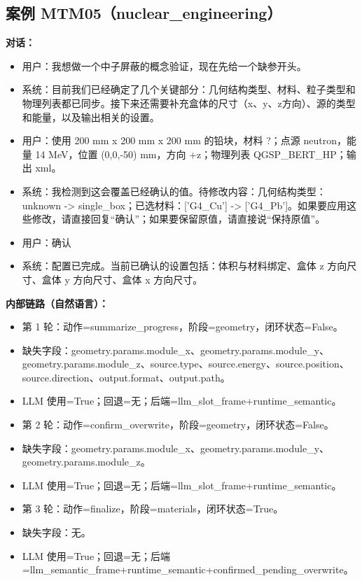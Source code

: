 \documentclass[11pt]{ctexart}
\begin{document}
\subsection{案例 MTM05（nuclear\_engineering）}
\textbf{对话：}
\begin{itemize}
\item 用户：我想做一个中子屏蔽的概念验证，现在先给一个缺参开头。
\item 系统：目前我们已经确定了几个关键部分：几何结构类型、材料、粒子类型和物理列表都已同步。接下来还需要补充盒体的尺寸（x、y、z方向）、源的类型和能量，以及输出相关的设置。
\item 用户：使用 200 mm x 200 mm x 200 mm 的铅块，材料 ?；点源 neutron，能量 14 MeV，位置 (0,0,-50) mm，方向 +z；物理列表 QGSP\_BERT\_HP；输出 xml。
\item 系统：我检测到这会覆盖已经确认的值。待修改内容：几何结构类型：unknown -> single\_box；已选材料：['G4\_Cu'] -> ['G4\_Pb']。如果要应用这些修改，请直接回复“确认”；如果要保留原值，请直接说“保持原值”。
\item 用户：确认
\item 系统：配置已完成。当前已确认的设置包括：体积与材料绑定、盒体 z 方向尺寸、盒体 y 方向尺寸、盒体 x 方向尺寸。
\end{itemize}
\textbf{内部链路（自然语言）：}
\begin{itemize}
\item 第 1 轮：动作=summarize\_progress，阶段=geometry，闭环状态=False。
\item 缺失字段：geometry.params.module\_x、geometry.params.module\_y、geometry.params.module\_z、source.type、source.energy、source.position、source.direction、output.format、output.path。
\item LLM 使用=True；回退=无；后端=llm\_slot\_frame+runtime\_semantic。
\item 第 2 轮：动作=confirm\_overwrite，阶段=geometry，闭环状态=False。
\item 缺失字段：geometry.params.module\_x、geometry.params.module\_y、geometry.params.module\_z。
\item LLM 使用=True；回退=无；后端=llm\_slot\_frame+runtime\_semantic。
\item 第 3 轮：动作=finalize，阶段=materials，闭环状态=True。
\item 缺失字段：无。
\item LLM 使用=True；回退=无；后端=llm\_semantic\_frame+runtime\_semantic+confirmed\_pending\_overwrite。
\end{itemize}
\end{document}
